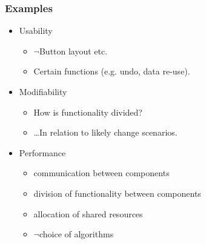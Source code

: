\documentclass[10pt]{beamer}
\begin{document}
\begin{frame}[t]
\frametitle{Examples}

\begin{itemize}[<+->]
\item Usability
\begin{itemize}
\item $\neg$Button layout etc.
\item Certain functions (e.g. undo, data re-use).
\end{itemize}
\item Modifiability
\begin{itemize}
\item How is functionality divided?
\item \ldots In relation to likely change scenarios.
\end{itemize}
\item Performance
\begin{itemize}
\item communication between components
\item division of functionality between components
\item allocation of shared resources
\item $\neg$choice of algorithms
\end{itemize}
\end{itemize}
\end{frame}
\end{document}
